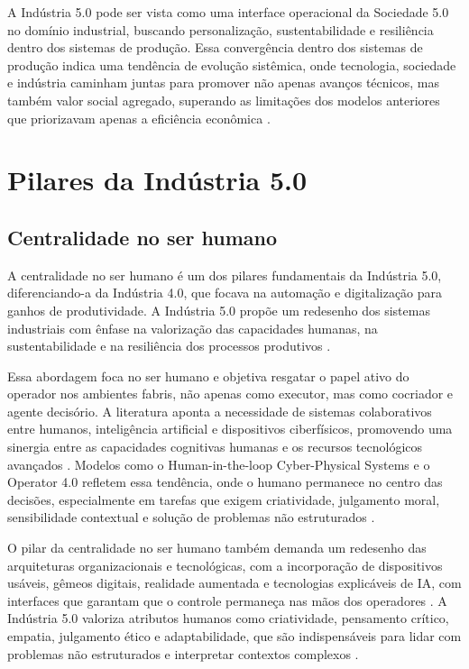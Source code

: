 A Indústria 5.0 pode ser vista como uma interface operacional da Sociedade 5.0 no domínio industrial, buscando personalização, sustentabilidade e resiliência dentro dos sistemas de produção.
Essa convergência dentro dos sistemas de produção indica uma tendência de evolução sistêmica, onde tecnologia, sociedade e indústria caminham juntas para promover não apenas avanços técnicos, mas também valor social agregado, superando as limitações dos modelos anteriores que priorizavam apenas a eficiência econômica \cite{VALETTE2023}.

\section{Pilares da Indústria 5.0}


\subsection{Centralidade no ser humano}

A centralidade no ser humano é um dos pilares fundamentais da Indústria 5.0, diferenciando-a da Indústria 4.0, que focava na automação e digitalização para ganhos de produtividade.
A Indústria 5.0 propõe um redesenho dos sistemas industriais com ênfase na valorização das capacidades humanas, na sustentabilidade e na resiliência dos processos produtivos \cite{VALETTE2023, euCommission2021}.

Essa abordagem foca no ser humano e objetiva resgatar o papel ativo do operador nos ambientes fabris, não apenas como executor, mas como cocriador e agente decisório.
A literatura aponta a necessidade de sistemas colaborativos entre humanos, inteligência artificial e dispositivos ciberfísicos, promovendo uma sinergia entre as capacidades cognitivas humanas e os recursos tecnológicos avançados \cite{TOTH2023, Santana_2023}.
Modelos como o Human-in-the-loop Cyber-Physical Systems e o Operator 4.0 refletem essa tendência, onde o humano permanece no centro das decisões, especialmente em tarefas que exigem criatividade, julgamento moral, sensibilidade contextual e solução de problemas não estruturados \cite{VALETTE2023, RANNERTSHAUSER2022}.

O pilar da centralidade no ser humano também demanda um redesenho das arquiteturas organizacionais e tecnológicas, com a incorporação de dispositivos usáveis, gêmeos digitais, realidade aumentada e tecnologias explicáveis de IA, com interfaces que garantam que o controle permaneça nas mãos dos operadores \cite{TOTH2023, YANG2024}.
A Indústria 5.0 valoriza atributos humanos como criatividade, pensamento crítico, empatia, julgamento ético e adaptabilidade, que são indispensáveis para lidar com problemas não estruturados e interpretar contextos complexos \cite{RANNERTSHAUSER2022, Nahavandi2019}.

